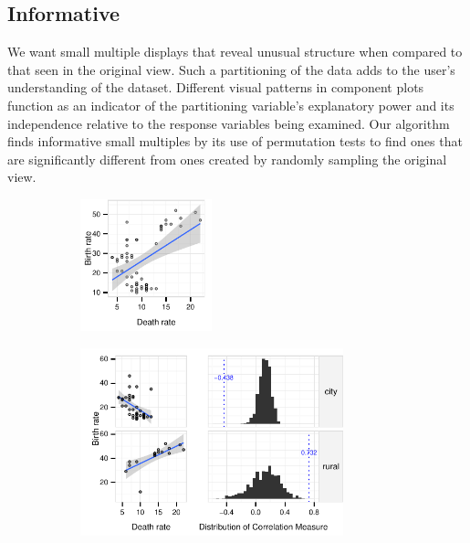 \subsection{Informative}
We want small multiple displays that reveal unusual structure when compared to that seen in the original view. Such a partitioning of the data adds to the user's understanding of the dataset. Different visual patterns in component plots function as an indicator of the partitioning variable's explanatory power and its independence relative to the response variables being examined. 
Our algorithm finds informative small multiples by its use of permutation tests to find ones that are significantly different from ones created by randomly sampling the original view.

\begin{figure}
 \centering 
	 \begin{subfigure}{1.5in}
		\includegraphics[width=1.5in]{images/DEATH_RT-BIRTH_RT.pdf}
		  \caption{}
		 \label{fig:informative_all}
	\end{subfigure}
	\begin{subfigure}{3in}
		\includegraphics[width=3in]{images/7_05653068514253-URBAN.pdf}
		 \label{fig:informative_sm}
		  \caption{}
	 \end{subfigure}
	\begin{subfigure}{3in}

\end{subfigure}
\end{figure}
